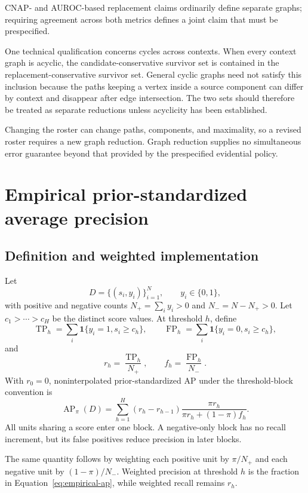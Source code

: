 \documentclass[11pt]{article}
\newcommand{\AP}{\operatorname{AP}}
\theoremstyle{remark}
\begin{document}
CNAP- and AUROC-based replacement claims ordinarily define separate graphs;
requiring agreement across both metrics defines a joint claim that must be
prespecified.

One technical qualification concerns cycles across contexts. When every
context graph is acyclic, the candidate-conservative survivor set is contained
in the replacement-conservative survivor set. General cyclic graphs need not
satisfy this inclusion because the paths keeping a vertex inside a source
component can differ by context and disappear after edge intersection. The two
sets should therefore be treated as separate reductions unless acyclicity has
been established.

Changing the roster can change paths, components, and maximality, so a revised
roster requires a new graph reduction. Graph reduction supplies no
simultaneous error guarantee beyond that provided by the prespecified
evidential policy.

\section{Empirical prior-standardized average precision}
\label{app:ap}

\subsection{Definition and weighted implementation}

Let
\[
D=\{(s_i,y_i)\}_{i=1}^N,
\qquad y_i\in\{0,1\},
\]
with positive and negative counts $N_+=\sum_i y_i>0$ and
$N_-=N-N_+>0$. Let $c_1>\cdots>c_H$ be the distinct score values. At
threshold $h$, define
\[
\operatorname{TP}_h
=\sum_i\mathbf 1\{y_i=1,s_i\geq c_h\},
\qquad
\operatorname{FP}_h
=\sum_i\mathbf 1\{y_i=0,s_i\geq c_h\},
\]
and
\[
r_h=\frac{\operatorname{TP}_h}{N_+},
\qquad
f_h=\frac{\operatorname{FP}_h}{N_-}.
\]
With $r_0=0$, noninterpolated prior-standardized AP under the threshold-block
convention is
\begin{equation}
\AP_\pi(D)
=
\sum_{h=1}^H
(r_h-r_{h-1})
\frac{\pi r_h}{\pi r_h+(1-\pi)f_h}.
\label{eq:empirical-ap}
\end{equation}
All units sharing a score enter one block. A negative-only block has no recall
increment, but its false positives reduce precision in later blocks.

The same quantity follows by weighting each positive unit by $\pi/N_+$ and
each negative unit by $(1-\pi)/N_-$. Weighted precision at threshold $h$ is
the fraction in Equation~\eqref{eq:empirical-ap}, while weighted recall remains
$r_h$.
\end{document}
